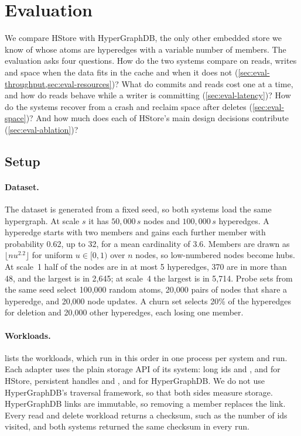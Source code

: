 \section{Evaluation}
\label{sec:evaluation}

We compare HStore with HyperGraphDB, the only other embedded store we know of whose atoms are hyperedges with a variable number of members. The evaluation asks four questions. How do the two systems compare on reads, writes and space when the data fits in the cache and when it does not (\cref{sec:eval-throughput,sec:eval-resources})? What do commits and reads cost one at a time, and how do reads behave while a writer is committing (\cref{sec:eval-latency})? How do the systems recover from a crash and reclaim space after deletes (\cref{sec:eval-space})? And how much does each of HStore's main design decisions contribute (\cref{sec:eval-ablation})?

\subsection{Setup}
\label{sec:eval-setup}

\paragraph{Dataset.} The dataset is generated from a fixed seed, so both systems load the same hypergraph. At scale $s$ it has $50{,}000\,s$ nodes and $100{,}000\,s$ hyperedges. A hyperedge starts with two members and gains each further member with probability 0.62, up to 32, for a mean cardinality of 3.6. Members are drawn as $\lfloor n u^{2.2}\rfloor$ for uniform $u\in[0,1)$ over $n$ nodes, so low-numbered nodes become hubs. At scale~1 half of the nodes are in at most 5 hyperedges, 370 are in more than 48, and the largest is in 2,645; at scale~4 the largest is in 5,714. Probe sets from the same seed select 100,000 random atoms, 20,000 pairs of nodes that share a hyperedge, and 20,000 node updates. A churn set selects 20\% of the hyperedges for deletion and 20,000 other hyperedges, each losing one member.

\paragraph{Workloads.}  lists the  workloads, which run in this order in one process per system and run. Each adapter uses the plain storage API of its system: long ids and ,  and  for HStore, persistent handles and ,  and  for HyperGraphDB. We do not use HyperGraphDB's traversal framework, so that both sides measure storage. HyperGraphDB links are immutable, so removing a member replaces the link. Every read and delete workload returns a checksum, such as the number of ids visited, and both systems returned the same checksum in every run.

